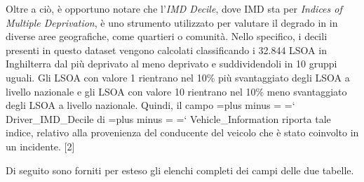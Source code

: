 \documentclass{article}
\renewcommand {\texttt}[1]{%
  \begingroup
    \spaceskip=\fontdimen2\font plus \fontdimen3\font minus \fontdimen4\font
    \xspaceskip=\fontdimen7\font\relax
    \ttfamily
    \hyphenchar\font=`\-
    #1
  \endgroup
}
\begin{document}
Oltre a ciò, è opportuno notare che l'\textit{IMD Decile}, dove IMD sta per \textit{Indices of Multiple Deprivation}, è uno strumento utilizzato per valutare il degrado in in diverse aree geografiche, come quartieri o comunità. Nello specifico, i decili presenti in questo dataset vengono calcolati classificando i 32.844 LSOA in Inghilterra dal più deprivato al meno deprivato e suddividendoli in 10 gruppi uguali. Gli LSOA con valore 1 rientrano nel 10\% più svantaggiato degli LSOA a livello nazionale e gli LSOA con valore 10 rientrano nel 10\% meno svantaggiato degli LSOA a livello nazionale. Quindi, il campo \texttt{Driver\_IMD\_Decile} di \texttt{Vehicle\_Information} riporta tale indice, relativo alla provenienza del conducente del veicolo che è stato coinvolto in un incidente. [2]

Di seguito sono forniti per esteso gli elenchi completi dei campi delle due tabelle.
\end{document}
